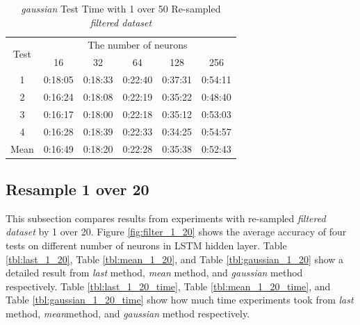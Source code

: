\documentclass[draft,dvipsnames]{drexel-thesis}
\begin{document}
\begin{thesis}
\begin{table}[!t]
\centering
\caption{{\em gaussian} Test Time with 1 over 50 Re-sampled {\em filtered dataset}}
\label{tbl:gaussian_1_50_time}
\begin{tabular}{|c|c|c|c|c|c|}
\hline
\multirow{2}{*}{Test}      & \multicolumn{5}{c|}{The number of neurons}                                                                                                               \\ \cline{2-6}
                           & 16                           & 32                           & 64                           & 128                          & 256                          \\ \hline
1                          & 0:18:05                      & 0:18:33                      & 0:22:40                      & 0:37:31                      & 0:54:11                      \\ \hline
2                          & 0:16:24                      & 0:18:08                      & 0:22:19                      & 0:35:22                      & 0:48:40                      \\ \hline
3                          & 0:16:17                      & 0:18:00                      & 0:22:18                      & 0:35:12                      & 0:53:03                      \\ \hline
4                          & 0:16:28                      & 0:18:39                      & 0:22:33                      & 0:34:25                      & 0:54:57                      \\ \hline
\multicolumn{1}{|l|}{Mean} & \multicolumn{1}{l|}{0:16:49} & \multicolumn{1}{l|}{0:18:20} & \multicolumn{1}{l|}{0:22:28} & \multicolumn{1}{l|}{0:35:38} & \multicolumn{1}{l|}{0:52:43} \\ \hline
\end{tabular}
\end{table}


\subsection{Resample 1 over 20}
This subsection compares results from experiments with re-sampled {\em filtered dataset} by 1 over 20. Figure \ref{fig:filter_1_20} shows the average accuracy of four tests on different number of neurons in LSTM hidden layer. Table \ref{tbl:last_1_20}, Table \ref{tbl:mean_1_20}, and Table \ref{tbl:gaussian_1_20} show a detailed result from {\em last} method, {\em mean} method, and {\em gaussian} method respectively. Table \ref{tbl:last_1_20_time}, Table \ref{tbl:mean_1_20_time}, and Table \ref{tbl:gaussian_1_20_time} show how much time experiments took from {\em last} method, {\em mean}method, and {\em gaussian} method respectively.


\end{thesis}
\end{document}
